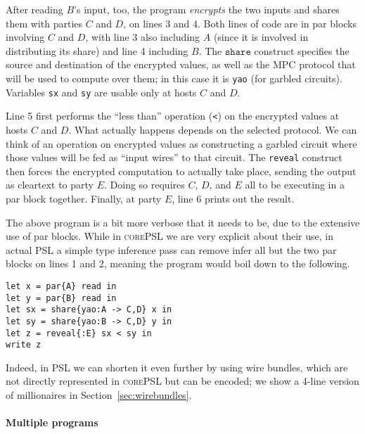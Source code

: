 \documentclass[10pt]{article}
\newcommand{\kw}[1]{\ensuremath{\mathtt{#1}}}
\newcommand{\lang}{\textsc{corePSL}\xspace}
\begin{document}
After reading $B$'s input, too, the program \emph{encrypts} the two
inputs and shares them with parties $C$ and $D$, on lines 3 and
4. Both lines of code are in par blocks involving $C$ and $D$, with
line 3 also including $A$ (since it is involved in distributing its
share) and line 4 including $B$. The $\kw{share}$ construct specifies
the source and destination of the encrypted values, as well as the MPC
protocol that will be used to compute over them; in this case it is
\texttt{yao} (for garbled circuits). Variables \texttt{sx} and
\texttt{sy} are usable only at hosts $C$ and $D$.

Line 5 first performs the ``less than'' operation (\texttt{<}) on the
encrypted values at hosts $C$ and $D$. What actually happens depends
on the selected protocol. We can think of an operation on encrypted
values as constructing a garbled circuit where those values will be
fed as ``input wires'' to that circuit. The \texttt{reveal} construct
then forces the encrypted computation to actually take place, sending
the output as cleartext to party $E$. Doing so requires $C$, $D$, and
$E$ all to be executing in a par block together. Finally, at party
$E$, line 6 prints out the result.

The above program is a bit more verbose that it needs to be, due to
the extensive use of par blocks. While in \lang we are very explicit
about their use, in actual PSL a simple type inference pass can remove
infer all but the two par blocks on lines 1 and 2, meaning the program
would boil down to the following.
\begin{verbatim}
let x = par{A} read in
let y = par{B} read in
let sx = share{yao:A -> C,D} x in
let sy = share{yao:B -> C,D} y in
let z = reveal{:E} sx < sy in
write z
\end{verbatim}
Indeed, in PSL we can shorten it even further by using wire bundles,
which are not directly represented in \lang but can be encoded; we
show a 4-line version of millionaires in
Section~\ref{sec:wirebundles}.

\paragraph{Multiple programs}
\end{document}
